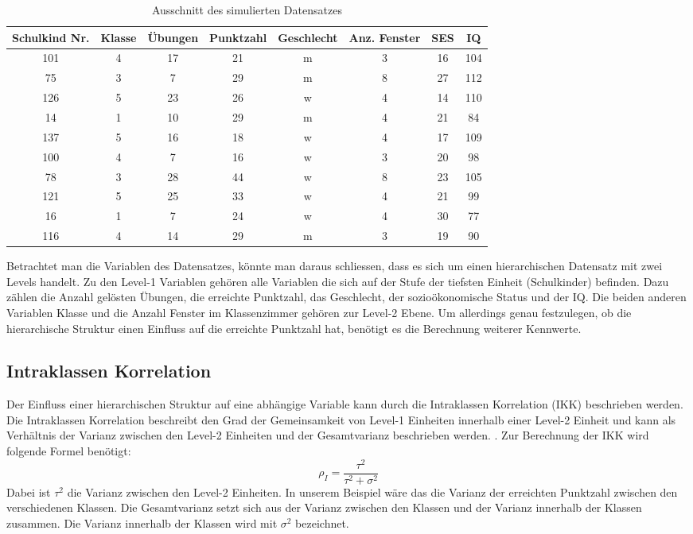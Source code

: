 \documentclass[12pt]{article}\usepackage[]{graphicx}\usepackage[]{color}
\numberwithin{equation}{section}
\begin{document}
\begin{table}[ht]
\centering
\caption{Ausschnitt des simulierten Datensatzes} 
\vspace{5mm}
\begin{tabular}{cccccccc}
  \toprule
 Schulkind Nr. & Klasse & Übungen & Punktzahl & Geschlecht & Anz. Fenster & SES & IQ \\ 
  \midrule
101 & 4 & 17 & 21 & m & 3 & 16 & 104 \\ 
  75 & 3 & 7 & 29 & m & 8 & 27 & 112 \\ 
  126 & 5 & 23 & 26 & w & 4 & 14 & 110 \\ 
  14 & 1 & 10 & 29 & m & 4 & 21 & 84 \\ 
  137 & 5 & 16 & 18 & w & 4 & 17 & 109 \\ 
  100 & 4 & 7 & 16 & w & 3 & 20 & 98 \\ 
  78 & 3 & 28 & 44 & w & 8 & 23 & 105 \\ 
  121 & 5 & 25 & 33 & w & 4 & 21 & 99 \\ 
  16 & 1 & 7 & 24 & w & 4 & 30 & 77 \\ 
  116 & 4 & 14 & 29 & m & 3 & 19 & 90 \\ 
   \bottomrule
\end{tabular}
\label{tab:beispiel_theorie}
\end{table}

Betrachtet man die Variablen des Datensatzes, könnte man daraus schliessen, dass es sich um einen hierarchischen Datensatz mit zwei Levels handelt. Zu den Level-1 Variablen gehören alle Variablen die sich auf der Stufe der tiefsten Einheit (Schulkinder) befinden. Dazu zählen die Anzahl gelösten Übungen, die erreichte Punktzahl, das Geschlecht, der sozioökonomische Status und der IQ. Die beiden anderen Variablen Klasse und die Anzahl Fenster im Klassenzimmer gehören zur Level-2 Ebene. Um allerdings genau festzulegen, ob die hierarchische Struktur einen Einfluss auf die erreichte Punktzahl hat, benötigt es die Berechnung weiterer Kennwerte. 

\subsection{Intraklassen Korrelation}
Der Einfluss einer hierarchischen Struktur auf eine abhängige Variable kann durch die Intraklassen Korrelation (IKK) beschrieben werden. Die Intraklassen Korrelation beschreibt den Grad der Gemeinsamkeit von Level-1 Einheiten innerhalb einer Level-2 Einheit und kann als Verhältnis der Varianz zwischen den Level-2 Einheiten und der Gesamtvarianz beschrieben werden. \citep{FieldAndy2013DsuR, SnijdersTomA.B2012Ma:a, twisk_2006}. Zur Berechnung der IKK wird folgende Formel benötigt:
\begin{equation}
\rho_{I} = \dfrac{\tau^{2}}{\tau^{2} + \sigma^{2}}
\end{equation} 
Dabei ist $\tau^2$ die Varianz zwischen den Level-2 Einheiten. In unserem Beispiel wäre das die Varianz der erreichten Punktzahl zwischen den verschiedenen Klassen. Die Gesamtvarianz setzt sich aus der Varianz zwischen den Klassen und der Varianz innerhalb der Klassen zusammen. Die Varianz innerhalb der Klassen wird mit $\sigma^2$ bezeichnet.
\end{document}
